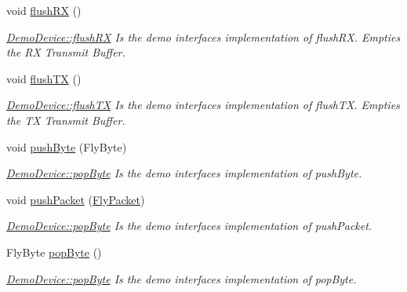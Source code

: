 \begin{DoxyCompactItemize}
\hypertarget{class_demo_device_abd7460c71a01d986b1f77908ccb779a2}{}\label{class_demo_device_abd7460c71a01d986b1f77908ccb779a2} 
void \hyperlink{class_demo_device_abd7460c71a01d986b1f77908ccb779a2}{flush\+RX} ()
\begin{DoxyCompactList}\small\item\em \hyperlink{class_demo_device_abd7460c71a01d986b1f77908ccb779a2}{Demo\+Device\+::flush\+RX} Is the demo interface\textquotesingle{}s implementation of flush\+RX. Empties the RX Transmit Buffer. \end{DoxyCompactList}\item 
\hypertarget{class_demo_device_a32e89c17f613abfa7f2a4d9f970bbffe}{}\label{class_demo_device_a32e89c17f613abfa7f2a4d9f970bbffe} 
void \hyperlink{class_demo_device_a32e89c17f613abfa7f2a4d9f970bbffe}{flush\+TX} ()
\begin{DoxyCompactList}\small\item\em \hyperlink{class_demo_device_a32e89c17f613abfa7f2a4d9f970bbffe}{Demo\+Device\+::flush\+TX} Is the demo interface\textquotesingle{}s implementation of flush\+TX. Empties the TX Transmit Buffer. \end{DoxyCompactList}\item 
void \hyperlink{class_demo_device_a064f0bc683663200243bd68ff3713c68}{push\+Byte} (Fly\+Byte)
\begin{DoxyCompactList}\small\item\em \hyperlink{class_demo_device_a788dd7e426fab9c8d19ea9fd106260d4}{Demo\+Device\+::pop\+Byte} Is the demo interface\textquotesingle{}s implementation of push\+Byte. \end{DoxyCompactList}\item 
void \hyperlink{class_demo_device_ac39f46589b28926cd40635ad42342a54}{push\+Packet} (\hyperlink{class_fly_packet}{Fly\+Packet})
\begin{DoxyCompactList}\small\item\em \hyperlink{class_demo_device_a788dd7e426fab9c8d19ea9fd106260d4}{Demo\+Device\+::pop\+Byte} Is the demo interface\textquotesingle{}s implementation of push\+Packet. \end{DoxyCompactList}\item 
Fly\+Byte \hyperlink{class_demo_device_a788dd7e426fab9c8d19ea9fd106260d4}{pop\+Byte} ()
\begin{DoxyCompactList}\small\item\em \hyperlink{class_demo_device_a788dd7e426fab9c8d19ea9fd106260d4}{Demo\+Device\+::pop\+Byte} Is the demo interface\textquotesingle{}s implementation of pop\+Byte. \end{DoxyCompactList}\item 

\end{DoxyCompactItemize}
